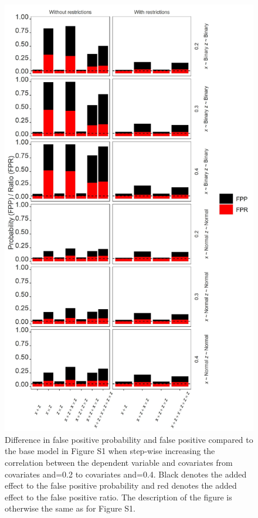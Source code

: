 \begin{figure}[hbt!]
\includegraphics{R/Analysis/Result/Figures/Figure2SI.jpeg}
\centering
\caption{Difference in false positive probability and false positive compared to the base model in Figure S1 when step-wise increasing the correlation between the dependent variable and covariates from covariates and=0.2 to covariates and=0.4. Black denotes the added effect to the false positive probability and red denotes the added effect to the false positive ratio.  The description of the figure is otherwise the same as for Figure S1.}
\label{fig:mainfigure}
\end{figure}


